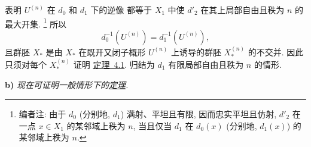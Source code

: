 \noindent 表明 \(U^{(n)}\) 在 \(d_0\) 和 \(d_1\) 下的逆像
都等于 \(X_1\) 中使 \(d'_2\) 在其上局部自由且秩为 \(n\) 的最大开集.%
\footnote{\label{note:sga3-V-27}编者注: 由于 \(d_0\) (分别地, \(d_1\))
满射、平坦且有限, 因而忠实平坦且仿射,
\(d'_2\) 在一点 \(x\in X_1\) 的某邻域上秩为 \(n\),
当且仅当 \(d_1\) 在 \(d_0(x)\) (分别地, \(d_1(x)\))
的某邻域上秩为 \(n\).}
所以
\[
  d_0^{-1}(U^{(n)})=d_1^{-1}(U^{(n)}),
\]
且群胚 \(X_\ast\) 是由 \(X_\ast\) 在既开又闭子概形
\(U^{(n)}\) 上诱导的群胚 \(X_\ast^{(n)}\) 的不交并.
因此只须对每个 \(X_\ast^{(n)}\) 证明
\hyperref[thm:sga3-V-4.1]{定理~4.1}. 归结为 \(d_1\) 有限局部自由且秩为 \(n\) 的情形.

\medskip
{}\label{par:sga3-V-5-b}%
\noindent\textbf{b)}
\textit{现在可证明一般情形下的\hyperref[thm:sga3-V-4.1]{定理}.}

